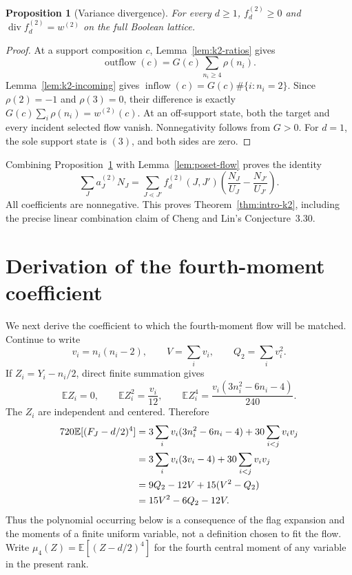 \documentclass[11pt]{amsart}
\newtheorem{proposition}[theorem]{Proposition}
\theoremstyle{definition}
\theoremstyle{remark}
\newcommand{\divg}{\operatorname{div}}
\newcommand{\E}{\mathbb E}
\begin{document}
\begin{proposition}[Variance divergence]
\label{prop:k2-divergence}
For every $d\ge1$, $f^{(2)}_d\ge0$ and
$\divg f^{(2)}_d=w^{(2)}$ on the full Boolean lattice.
\end{proposition}

\begin{proof}
At a support composition $c$, Lemma~\ref{lem:k2-ratios} gives
\[
 \operatorname{outflow}(c)
 =G(c)\sum_{n_i\ge4}\rho(n_i).
\]
Lemma~\ref{lem:k2-incoming} gives
$\operatorname{inflow}(c)=G(c)\#\{i:n_i=2\}$.  Since
$\rho(2)=-1$ and $\rho(3)=0$, their difference is exactly
$G(c)\sum_i\rho(n_i)=w^{(2)}(c)$.  At an off-support state, both the
target and every incident selected flow vanish.  Nonnegativity follows from
$G>0$.  For $d=1$, the sole support state is $(3)$, and both sides are
zero.
\end{proof}

Combining Proposition~\ref{prop:k2-divergence} with
Lemma~\ref{lem:poset-flow} proves the identity
\[
 \sum_Ja_J^{(2)}N_J
 =\sum_{J\lessdot J'}f^{(2)}_d(J,J')
 \left(\frac{N_J}{U_J}-\frac{N_{J'}}{U_{J'}}\right).
\]
All coefficients are nonnegative.  This proves
Theorem~\ref{thm:intro-k2}, including the precise linear combination claim
of Cheng and Lin's Conjecture~3.30.

\section{Derivation of the fourth-moment coefficient}
\label{sec:k4-coefficient}

We next derive the coefficient to which the fourth-moment flow will be
matched.  Continue to write
\[
 v_i=n_i(n_i-2),\qquad V=\sum_i v_i,
 \qquad Q_2=\sum_i v_i^2.
\]
If $Z_i=Y_i-n_i/2$, direct finite summation gives
\begin{equation}
 \E Z_i=0,\qquad
 \E Z_i^2=\frac{v_i}{12},\qquad
 \E Z_i^4=\frac{v_i(3n_i^2-6n_i-4)}{240}.
 \label{eq:block-moments}
\end{equation}
The $Z_i$ are independent and centered.  Therefore
\begin{align}
 720\E[(F_J-d/2)^4]
 &=3\sum_i v_i(3n_i^2-6n_i-4)
    +30\sum_{i<j}v_iv_j\notag\\
 &=3\sum_i v_i(3v_i-4)+30\sum_{i<j}v_iv_j\notag\\
 &=9Q_2-12V+15(V^2-Q_2)\notag\\
 &=15V^2-6Q_2-12V.
 \label{eq:k4-block-expansion}
\end{align}
Thus the polynomial occurring below is a consequence of the flag expansion
and the moments of a finite uniform variable, not a definition chosen to
fit the flow.  Write $\mu_4(Z)=\E[(Z-d/2)^4]$ for the fourth central moment
of any variable in the present rank.
\end{document}
